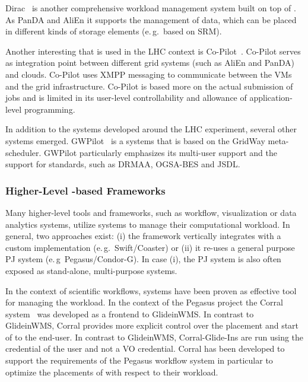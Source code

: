 \documentclass{sig-alternate}
\begin{document}
Dirac~\cite{1742-6596-219-6-062049} is another comprehensive workload
management system built on top of \pilots. As PanDA and AliEn it supports the
management of data, which can be placed in different kinds of storage elements
(e.\,g.\ based on SRM).

Another interesting \pilot that is used in the LHC context is
Co-Pilot~\cite{copilot-tr}. Co-Pilot serves as integration point between
different grid \pilotjob systems (such as AliEn and PanDA) and clouds.
Co-Pilot uses XMPP messaging to communicate between the VMs and the grid
infrastructure. Co-Pilot is based more on the actual submission of jobs and is
limited in its user-level controllability and allowance of application-level
programming.

In addition to the \pilotjob systems developed around the LHC experiment, 
several other systems emerged. GWPilot~\cite{gwpilot} is a \pilot systems that 
is based on the GridWay meta-scheduler. GWPilot particularly emphasizes its 
multi-user support and the support for standards, such as DRMAA, OGSA-BES and 
JSDL.

\subsubsection{Higher-Level \pilot-based Frameworks}

Many higher-level tools and frameworks, such as workflow,
visualization or data analytics systems, utilize \pilotjob systems to
manage their computational workload. In general, two approaches exist:
(i) the framework vertically integrates with a custom \pilotjob
implementation (e.\,g.\ Swift/Coaster) or (ii) it re-uses a general
purpose PJ system (e.\,g\ Pegasus/Condor-G). In case (i), the PJ
system is also often exposed as stand-alone, multi-purpose \pilotjob systems. 

In the context of scientific workflows, \pilotjob systems have been
proven as effective tool for managing the workload. In the context of
the Pegasus project the Corral
system~\cite{Rynge:2011:EUG:2116259.2116599} was developed as a
frontend to GlideinWMS. In contrast to GlideinWMS, Corral provides
more explicit control over the placement and start of \pilots to the
end-user. In contrast to GlideinWMS, Corral-Glide-Ins are run using
the credential of the user and not a VO credential. Corral has been
developed to support the requirements of the Pegasus workflow system
in particular to optimize the placements of \pilots with respect to
their workload.
\end{document}
